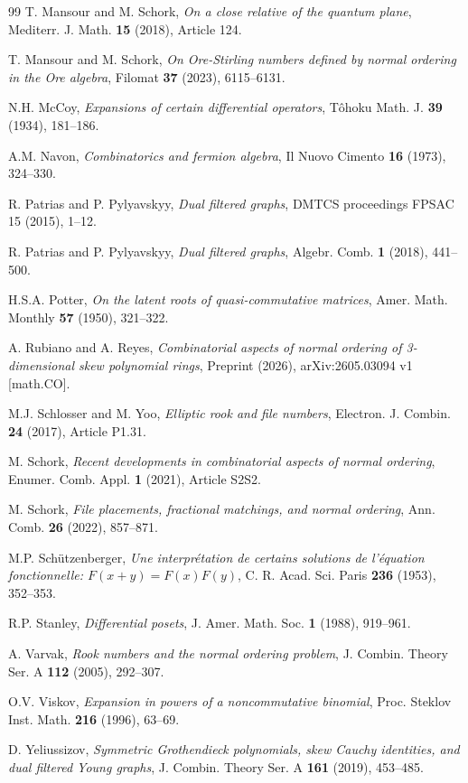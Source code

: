 \documentclass[10pt]{amsart}
\begin{document}
\begin{thebibliography}{99}
T. Mansour and M. Schork, {\em On a close relative of the quantum plane}, Mediterr. J. Math. {\bf 15} (2018), Article 124.

T. Mansour and M. Schork, {\em On Ore-Stirling numbers defined by normal ordering in the Ore algebra}, Filomat {\bf 37} (2023), 6115--6131.

N.H. McCoy, \emph{Expansions of certain differential operators}, T{\^o}hoku Math. J. {\bf 39} (1934), 181--186.

A.M. Navon, \emph{Combinatorics and fermion algebra}, Il Nuovo Cimento {\bf 16} (1973), 324--330.

R. Patrias and P. Pylyavskyy, {\em Dual filtered graphs}, DMTCS proceedings FPSAC 15 (2015), 1--12.

R. Patrias and P. Pylyavskyy, {\em Dual filtered graphs}, Algebr. Comb. {\bf1} (2018), 441--500.

H.S.A. Potter, \emph{On the latent roots of quasi-commutative matrices}, Amer. Math. Monthly \textbf{57} (1950), 321--322.

A. Rubiano and A. Reyes, {\em Combinatorial aspects of normal ordering of 3-dimensional skew polynomial rings}, Preprint (2026), arXiv:2605.03094 v1 [math.CO].

M.J. Schlosser and M. Yoo, {\em Elliptic rook and file numbers}, Electron. J. Combin. {\bf 24} (2017), Article P1.31. 

M. Schork, {\em Recent developments in combinatorial aspects of normal ordering}, Enumer. Comb. Appl. {\bf 1} (2021), Article S2S2. 

M. Schork, {\em File placements, fractional matchings, and normal ordering}, Ann. Comb. {\bf 26} (2022), 857--871.

M.P. Sch\"{u}tzenberger, \emph{Une interpr\'{e}tation de certains solutions de l'\'{e}quation
fonctionnelle: $F(x+y) = F(x)F(y)$},  C. R. Acad. Sci. Paris \textbf{236} (1953), 352--353.

R.P. Stanley, \emph{Differential posets}, J. Amer. Math. Soc. \textbf{1} (1988), 919--961.

A. Varvak, \emph{Rook numbers and the normal ordering problem}, J. Combin. Theory Ser. A \textbf{112} (2005), 292--307.

O.V. Viskov, \emph{Expansion in powers of a noncommutative binomial}, Proc. Steklov Inst. Math. \textbf{216} (1996), 63--69.

D. Yeliussizov, \emph{Symmetric {Grothendieck} polynomials, skew {Cauchy} identities, and dual filtered {Young} graphs}, J. Combin. Theory Ser. A \textbf{161} (2019), 453--485.

\end{thebibliography}
\end{document}
